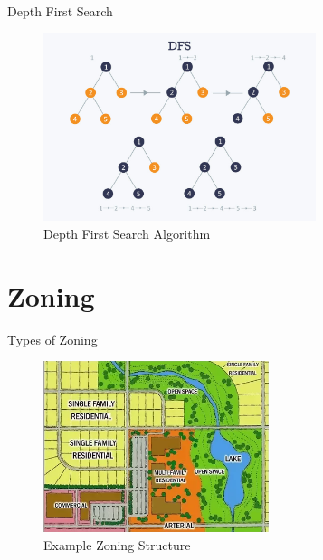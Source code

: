 \documentclass[10pt, aspectratio=169]{beamer}
\begin{document}
\begin{frame}{Depth First Search}
    \begin{center}
        \begin{figure}
            \centering
            \includegraphics[height=5.5cm, keepaspectratio]{images/depthfirstsearch.jpg}
            \caption{Depth First Search Algorithm \cite{depthfirstsearch}}
        \end{figure}
    \end{center}
\end{frame}


\section{Zoning}

\begin{frame}[fragile]{Types of Zoning}
    \begin{figure}
        \centering
        \includegraphics[height=5cm, keepaspectratio]{images/zoning.png}
        \caption{Example Zoning Structure \cite{zoningdiagram}}
    \end{figure}
\end{frame}
\end{document}
